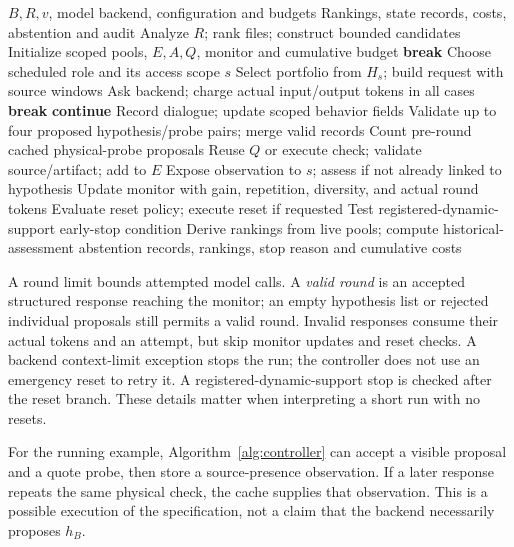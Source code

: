 \documentclass[letterpaper,journal]{IEEEtran}
\newcommand{\code}[1]{\texttt{\detokenize{#1}}}
\begin{document}
\begin{algorithm}[t]
\caption{Budgeted localization controller (canonical Algorithm 1)}\label{alg:controller}
\begin{algorithmic}[1]\small
\Require $B,R,v$, model backend, configuration and budgets
\Ensure Rankings, state records, costs, abstention and audit
\State Analyze $R$; rank files; construct bounded candidates
\State Initialize scoped pools, $E,A,Q$, monitor and cumulative budget
   \State \textbf{break} \EndIf
  \State Choose scheduled role and its access scope $s$
  \State Select portfolio from $H_s$; build request with source windows
  \State Ask backend; charge actual input/output tokens in all cases
   \State \textbf{break} \EndIf
   \State \textbf{continue} \EndIf
  \State Record dialogue; update scoped behavior fields
  \State Validate up to four proposed hypothesis/probe pairs; merge valid records
  \State Count pre-round cached physical-probe proposals
      \State Reuse $Q$ or execute check; validate source/artifact; add to $E$
      \State Expose observation to $s$; assess if not already linked to hypothesis
    \EndFor
  \EndIf
  \State Update monitor with gain, repetition, diversity, and actual round tokens
  \State Evaluate reset policy; execute reset if requested
  \State Test registered-dynamic-support early-stop condition
\EndFor
\State Derive rankings from live pools; compute historical-assessment abstention
\State \Return records, rankings, stop reason and cumulative costs
\end{algorithmic}
\end{algorithm}

A round limit bounds attempted model calls. A \emph{valid round} is an accepted structured response reaching the monitor; an empty hypothesis list or rejected individual proposals still permits a valid round. Invalid responses consume their actual tokens and an attempt, but skip monitor updates and reset checks. A backend context-limit exception stops the run; the controller does not use an emergency reset to retry it. A registered-dynamic-support stop is checked after the reset branch. These details matter when interpreting a short run with no resets.

For the running example, Algorithm~\ref{alg:controller} can accept a visible \code{config.py} proposal and a quote probe, then store a source-presence observation. If a later response repeats the same physical check, the cache supplies that observation. This is a possible execution of the specification, not a claim that the backend necessarily proposes $h_B$.
\end{document}
